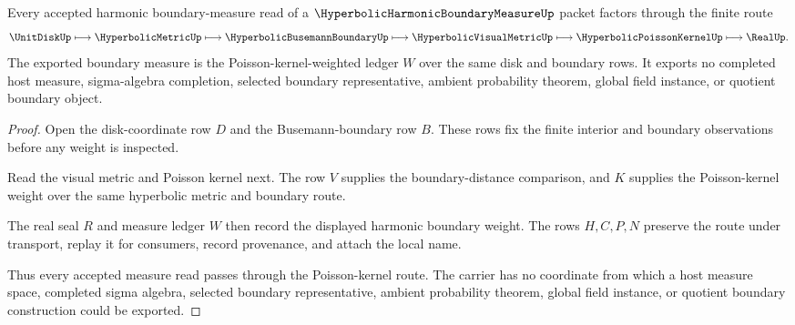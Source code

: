\begin{theorem}
\label{thm:hyperbolic-harmonic-boundary-measure-poisson-route}
Every accepted harmonic boundary-measure read of a $\HyperbolicHarmonicBoundaryMeasureUp$ packet factors through the finite route
$$
\UnitDiskUp
\longmapsto
\HyperbolicMetricUp
\longmapsto
\HyperbolicBusemannBoundaryUp
\longmapsto
\HyperbolicVisualMetricUp
\longmapsto
\HyperbolicPoissonKernelUp
\longmapsto
\RealUp .
$$
The exported boundary measure is the Poisson-kernel-weighted ledger $W$ over the same disk and boundary rows. It exports no completed host measure, sigma-algebra completion, selected boundary representative, ambient probability theorem, global field instance, or quotient boundary object.
\end{theorem}
\begin{proof}
Open the disk-coordinate row $D$ and the Busemann-boundary row $B$. These rows fix the finite interior and boundary observations before any weight is inspected.

Read the visual metric and Poisson kernel next. The row $V$ supplies the boundary-distance comparison, and $K$ supplies the Poisson-kernel weight over the same hyperbolic metric and boundary route.

The real seal $R$ and measure ledger $W$ then record the displayed harmonic boundary weight. The rows $H,C,P,N$ preserve the route under transport, replay it for consumers, record provenance, and attach the local name.

Thus every accepted measure read passes through the Poisson-kernel route. The carrier has no coordinate from which a host measure space, completed sigma algebra, selected boundary representative, ambient probability theorem, global field instance, or quotient boundary construction could be exported.
\end{proof}



